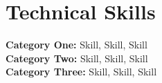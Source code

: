 \section{Technical Skills}
\begin{onecolentry}
\textbf{Category One:} Skill, Skill, Skill\\
\textbf{Category Two:} Skill, Skill, Skill\\
\textbf{Category Three:} Skill, Skill, Skill
\end{onecolentry}

